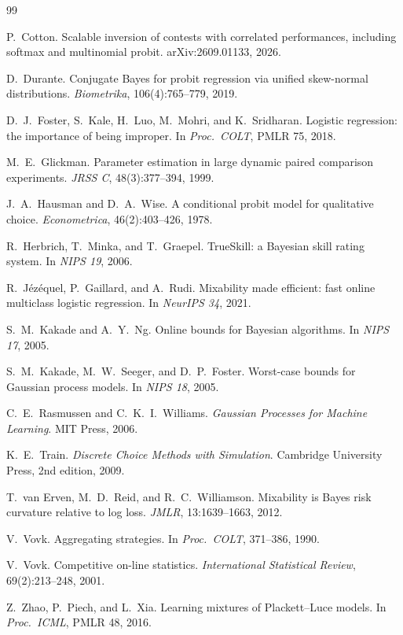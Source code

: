 \documentclass[11pt]{article}
\begin{document}
\begin{thebibliography}{99}

 P.~Cotton. Scalable inversion of
contests with correlated performances, including softmax and
multinomial probit. arXiv:2609.01133, 2026.

 D.~Durante. Conjugate Bayes for
probit regression via unified skew-normal distributions.
\emph{Biometrika}, 106(4):765--779, 2019.

 D.~J.~Foster, S.~Kale,
H.~Luo, M.~Mohri, and K.~Sridharan. Logistic regression: the
importance of being improper. In \emph{Proc.\ COLT}, PMLR 75, 2018.

 M.~E.~Glickman. Parameter
estimation in large dynamic paired comparison experiments.
\emph{JRSS C}, 48(3):377--394, 1999.

 J.~A.~Hausman and
D.~A.~Wise. A conditional probit model for qualitative choice.
\emph{Econometrica}, 46(2):403--426, 1978.

 R.~Herbrich, T.~Minka,
and T.~Graepel. TrueSkill: a Bayesian skill rating system. In
\emph{NIPS 19}, 2006.

 R.~J\'ez\'equel,
P.~Gaillard, and A.~Rudi. Mixability made efficient: fast online
multiclass logistic regression. In \emph{NeurIPS 34}, 2021.

 S.~M.~Kakade and A.~Y.~Ng.
Online bounds for Bayesian algorithms. In \emph{NIPS 17}, 2005.

 S.~M.~Kakade, M.~W.~Seeger,
and D.~P.~Foster. Worst-case bounds for Gaussian process models. In
\emph{NIPS 18}, 2005.

 C.~E.~Rasmussen
and C.~K.~I.~Williams. \emph{Gaussian Processes for Machine Learning}.
MIT Press, 2006.

 K.~E.~Train. \emph{Discrete Choice
Methods with Simulation}. Cambridge University Press, 2nd edition, 2009.

 T.~van Erven,
M.~D.~Reid, and R.~C.~Williamson. Mixability is Bayes risk curvature
relative to log loss. \emph{JMLR}, 13:1639--1663, 2012.

 V.~Vovk. Aggregating strategies. In
\emph{Proc.\ COLT}, 371--386, 1990.

 V.~Vovk. Competitive on-line statistics.
\emph{International Statistical Review}, 69(2):213--248, 2001.

 Z.~Zhao, P.~Piech, and L.~Xia.
Learning mixtures of Plackett--Luce models. In \emph{Proc.\ ICML}, PMLR
48, 2016.

\end{thebibliography}
\end{document}
